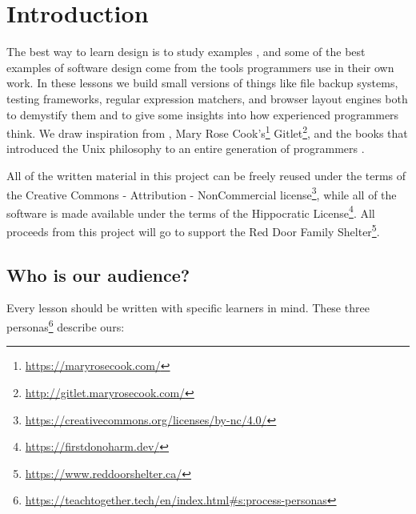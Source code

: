 \documentclass[krantzl]{krantz}
\newcommand{\hreffoot}[2]{{#1}\footnote{\href{#2}{#2}}}
\begin{document}

\maketitle

\frontmatter\setcounter{page}{5}



\tableofcontents

\mainmatter

\chapter{Introduction}\label{introduction}


The best way to learn design is to study examples \cite{Schon1984,Petre2016},
and some of the best examples of software design come from
the tools programmers use in their own work.
In these lessons we build small versions of things like file backup systems,
testing frameworks,
regular expression matchers,
and browser layout engines
both to demystify them
and to give some insights into how experienced programmers think.
We draw inspiration from \cite{Brown2011,Brown2012,Brown2016},
\hreffoot{Mary Rose Cook’s}{https://maryrosecook.com/} \hreffoot{Gitlet}{http://gitlet.maryrosecook.com/},
and the books that introduced the Unix philosophy to an entire generation of programmers
\cite{Kernighan1979,Kernighan1981,Kernighan1983,Kernighan1988}.


All of the written material in this project can be freely reused
under the terms of the \hreffoot{Creative Commons - Attribution - NonCommercial license}{https://creativecommons.org/licenses/by-nc/4.0/},
while all of the software is made available under the terms of
the \hreffoot{Hippocratic License}{https://firstdonoharm.dev/}.
All proceeds from this project will go to support the \hreffoot{Red Door Family Shelter}{https://www.reddoorshelter.ca/}.

\section{Who is our audience?}\label{introduction-audience}


Every lesson should be written with specific learners in mind.
These three \hreffoot{personas}{https://teachtogether.tech/en/index.html\#s:process-personas} describe ours:
\end{document}
